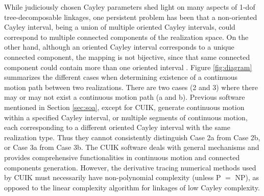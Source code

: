 \documentclass[prodmode,acmtoms]{acmsmall}
\begin{document}


While judiciously chosen Cayley parameters  
shed light on many aspects of 1-dof tree-decomposable linkages,  
one persistent problem has been that %
a non-oriented Cayley interval, being a union of multiple oriented Cayley intervals, 
could correspond to multiple connected components of the realization space. 
On the other hand, although an oriented Cayley interval corresponds to a unique connected component, 
the mapping is not bijective, since that same connected component could contain more than one oriented interval \cite[Section 1.2]{sitharam2014beast}.
Figure \ref{fig:diagram} summarizes the different cases when 
determining existence of a continuous motion path between two realizations. 
There are two cases (2 and 3) where there may or may not exist a continuous motion path (a and b).
Previous software  
mentioned in Section \ref{sec:soa}, except for CUIK, 
generate continuous motion within a specified Cayley interval, 
or multiple segments of continuous motion, 
each corresponding to a different oriented Cayley interval with the same realization type. 
Thus they cannot consistently distinguish Case 2a from Case 2b, %
or Case 3a from Case 3b. %
The CUIK software deals with general mechanisms and 
provides comprehensive functionalities in continuous motion and connected components generation. %
However, the derivative tracing numerical methods used by CUIK %
must necessarily have non-polynomial complexity (unless P $=$ NP), 
as opposed to the linear complexity algorithm \cite[Theorem 3]{Sitharam2011a} for linkages of low Cayley complexity.
\end{document}
